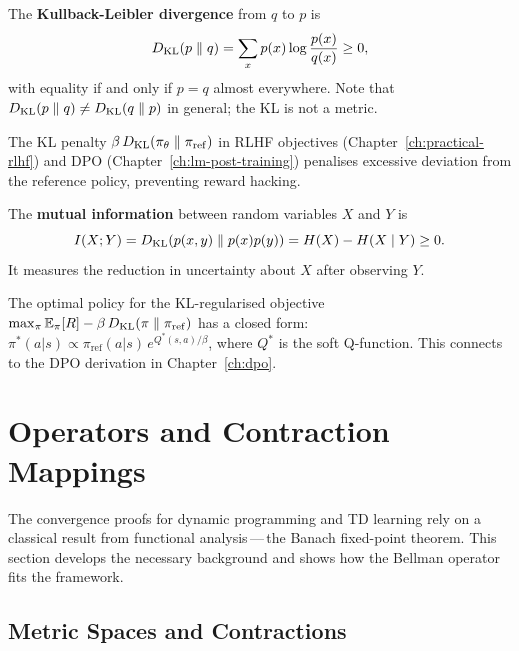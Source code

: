 \begin{definition}[KL Divergence]
\label{def:kl}
The \textbf{Kullback-Leibler divergence} from $q$ to
$p$ is
\[
    D_{\mathrm{KL}}\!\left(p\;\|\;q\right) = \sum_x p(x)\log\frac{p(x)}{q(x)} \geq 0,
\]
with equality if and only if $p = q$ almost everywhere.  Note that
$D_{\mathrm{KL}}\!\left(p\;\|\;q\right) \neq D_{\mathrm{KL}}\!\left(q\;\|\;p\right)$ in general; the KL is not a metric.
\end{definition}

The KL penalty $\beta\,D_{\mathrm{KL}}\!\left(\pi_\theta\;\|\;\pi_\mathrm{ref}\right)$ in RLHF
objectives (Chapter~\ref{ch:practical-rlhf}) and DPO
(Chapter~\ref{ch:lm-post-training}) penalises excessive deviation from the
reference policy, preventing reward hacking.

\begin{definition}
\label{def:mutual-info}
The \textbf{mutual information} between random variables $X$ and $Y$ is
\[
    I(X;Y) = D_{\mathrm{KL}}\!\left(p(x,y)\;\|\;p(x)p(y)\right)
            = H(X) - H(X \mid Y) \geq 0.
\]
It measures the reduction in uncertainty about $X$ after observing $Y$.
\end{definition}

\begin{example}[KL regularised RL]
The optimal policy for the KL-regularised objective
$\max_\pi \operatorname{\mathbb{E}}_\pi[R] - \beta\,D_{\mathrm{KL}}\!\left(\pi\;\|\;\pi_\mathrm{ref}\right)$
has a closed form: $\pi^*(a|s) \propto \pi_\mathrm{ref}(a|s)\,
e^{Q^*(s,a)/\beta}$, where $Q^*$ is the soft Q-function.  This
connects to the DPO derivation in Chapter~\ref{ch:dpo}.
\end{example}

\section{Operators and Contraction Mappings}
\label{app:operators}

The convergence proofs for dynamic programming and TD learning rely on a
classical result from functional analysis\,---\,the Banach fixed-point
theorem.  This section develops the necessary background and shows how the
Bellman operator fits the framework.

\subsection*{Metric Spaces and Contractions}

